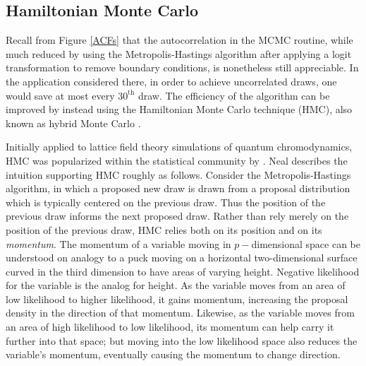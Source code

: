 \documentclass{article}
\begin{document}




\subsection{Hamiltonian Monte Carlo}

Recall from Figure \ref{ACFs} that the autocorrelation in the MCMC routine, while much reduced by using the Metropolis-Hastings algorithm after applying a logit transformation to remove boundary conditions, is nonetheless still appreciable. In the application considered there, in order to achieve uncorrelated draws, one would save at most every $30^{\text{th} }$ draw. The efficiency of the algorithm can be improved by instead using the Hamiltonian Monte Carlo technique (HMC), also known as hybrid Monte Carlo \citep{Duane1987}. 

Initially applied to lattice field theory simulations of quantum chromodynamics, HMC was popularized within the statistical community by \cite{Neal2011}. Neal describes the intuition supporting HMC roughly as follows. Consider the Metropolis-Hastings algorithm, in which a proposed new draw is drawn from a proposal distribution which is typically centered on the previous draw. Thus the position of the previous draw informs the next proposed draw. Rather than rely merely on the position of the previous draw, HMC relies both on its position and on its \emph{momentum}. The momentum of a variable moving in $p-$dimensional space can be understood on analogy to a puck moving on a horizontal two-dimensional surface curved in the third dimension to have areas of varying height. Negative likelihood for the variable is the analog for height. As the variable moves from an area of low likelihood to higher likelihood, it gains momentum, increasing the proposal density in the direction of that momentum. Likewise, as the variable moves from an area of high likelihood to low likelihood, its momentum can help carry it further into that space; but moving into the low likelihood space also reduces the variable's momentum, eventually causing the momentum to change direction.
\end{document}
